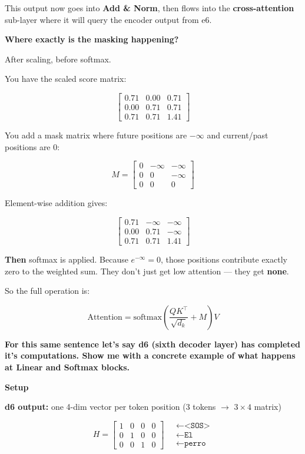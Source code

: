 This output now goes into \textbf{Add \& Norm}, then flows into the \textbf{cross-attention} sub-layer where it will query the encoder output from e6.

\bigskip

\textbf{Where exactly is the masking happening?}

After scaling, before softmax.

You have the scaled score matrix:

\[
\begin{bmatrix}0.71 & 0.00 & 0.71\\ 0.00 & 0.71 & 0.71\\ 0.71 & 0.71 & 1.41\end{bmatrix}
\]

You add a mask matrix where future positions are $-\infty$ and current/past positions are $0$:

\[
M = \begin{bmatrix}0 & -\infty & -\infty\\ 0 & 0 & -\infty\\ 0 & 0 & 0\end{bmatrix}
\]

Element-wise addition gives:

\[
\begin{bmatrix}0.71 & -\infty & -\infty\\ 0.00 & 0.71 & -\infty\\ 0.71 & 0.71 & 1.41\end{bmatrix}
\]

\textbf{Then} softmax is applied. Because $e^{-\infty} = 0$, those positions contribute exactly zero to the weighted sum. They don't just get low attention --- they get \textbf{none}.

So the full operation is:

\[
\text{Attention} = \text{softmax}\!\left(\frac{QK^\top}{\sqrt{d_k}} + M\right)V
\]

\bigskip

\textbf{For this same sentence let's say d6 (sixth decoder layer) has completed it's computations. Show me with a concrete example of what happens at Linear and Softmax blocks.}

\noindent\textbf{Setup}

\noindent\textbf{d6 output:} one 4-dim vector per token position (3 tokens $\to$ $3\times4$ matrix)

\[
H = \begin{bmatrix}1 & 0 & 0 & 0 \\ 0 & 1 & 0 & 0 \\ 0 & 0 & 1 & 0\end{bmatrix}
\quad
\begin{array}{l}\leftarrow \texttt{<SOS>}\\\leftarrow \texttt{El}\\\leftarrow \texttt{perro}\end{array}
\]

